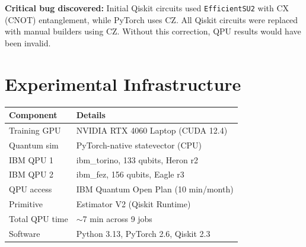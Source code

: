 \documentclass[conference,onecolumn,11pt]{IEEEtran}
\begin{document}
\textbf{Critical bug discovered:} Initial Qiskit circuits used \texttt{EfficientSU2} with CX (CNOT) entanglement, while PyTorch uses CZ. All Qiskit circuits were replaced with manual builders using CZ. Without this correction, QPU results would have been invalid.

\section{Experimental Infrastructure}
\label{app:infra}

\begin{table}[h]
\centering
\begin{tabular}{ll}
\toprule
Component & Details \\
\midrule
Training GPU & NVIDIA RTX 4060 Laptop (CUDA 12.4) \\
Quantum sim & PyTorch-native statevector (CPU) \\
IBM QPU 1 & ibm\_torino, 133 qubits, Heron r2 \\
IBM QPU 2 & ibm\_fez, 156 qubits, Eagle r3 \\
QPU access & IBM Quantum Open Plan (10 min/month) \\
Primitive & Estimator V2 (Qiskit Runtime) \\
Total QPU time & $\sim$7 min across 9 jobs \\
Software & Python 3.13, PyTorch 2.6, Qiskit 2.3 \\
\bottomrule
\end{tabular}
\end{table}
\end{document}
